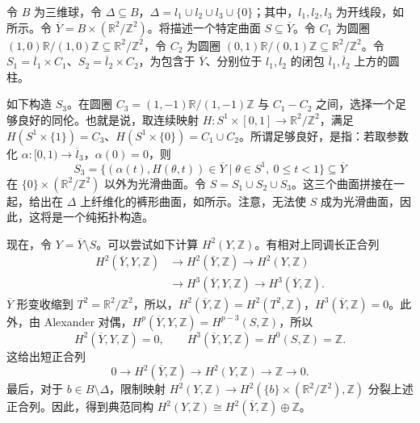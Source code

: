 \begin{construction}\label{constr:6.90}
令 $B$ 为三维球，令 $\Delta\subseteq B$，$\Delta=l_1\cup l_2\cup l_3\cup\{0\}$；其中，$l_1,l_2,l_3$ 为开线段，如所示。令 $\overline Y=B\times(\mathbb R^2/\mathbb Z^2)$。将描述一个特定曲面 $S\subseteq\overline Y$。令 $C_1$ 为圆圈 $(1,0)\mathbb R/(1,0)\mathbb Z\subseteq\mathbb R^2/\mathbb Z^2$，令 $C_2$ 为圆圈 $(0,1)\mathbb R/(0,1)\mathbb Z\subseteq\mathbb R^2/\mathbb Z^2$。令 $S_1=\overline l_1\times C_1$、$S_2=\overline l_2\times C_2$，为包含于 $\overline Y$、分别位于 $l_1,l_2$ 的闭包 $\overline l_1,\overline l_2$ 上方的圆柱。
\begin{figure}[H]
\centering
{}
\BookNumberOnlyCaption\label{fig:6.7}
\end{figure}

如下构造 $S_3$。在圆圈 $C_3=(1,-1)\mathbb R/(1,-1)\mathbb Z$ 与 $C_1-C_2$ 之间，选择一个足够良好的同伦。也就是说，取连续映射 $H\colon S^1\times[0,1]\to\mathbb R^2/\mathbb Z^2$，满足 $H(S^1\times\{1\})=C_3$、$H(S^1\times\{0\})=C_1\cup C_2$。所谓足够良好，是指：若取参数化 $\alpha\colon[0,1)\to\overline l_3$，$\alpha(0)=0$，则
\[
S_3=\{(\alpha(t),H(\theta,t))\in\overline Y
\mid\theta\in S^1,\ 0\leq t<1\}\subseteq\overline Y
\]
在 $\{0\}\times(\mathbb R^2/\mathbb Z^2)$ 以外为光滑曲面。令 $S=S_1\cup S_2\cup S_3$。这三个曲面拼接在一起，给出在 $\Delta$ 上纤维化的裤形曲面，如所示。注意，无法使 $S$ 成为光滑曲面，因此，这将是一个纯拓扑构造。

现在，令 $Y=\overline Y\setminus S$。可以尝试如下计算 $H^2(Y,\mathbb Z)$。有相对上同调长正合列
\[
\begin{aligned}
H^2(\overline Y,Y,\mathbb Z)&\longrightarrow H^2(\overline Y,\mathbb Z)
\longrightarrow H^2(Y,\mathbb Z)\\
&\longrightarrow H^3(\overline Y,Y,\mathbb Z)
\longrightarrow H^3(\overline Y,\mathbb Z).
\end{aligned}
\]
$\overline Y$ 形变收缩到 $T^2=\mathbb R^2/\mathbb Z^2$，所以，$H^2(\overline Y,\mathbb Z)=H^2(T^2,\mathbb Z)$，$H^3(\overline Y,\mathbb Z)=0$。此外，由 Alexander 对偶，$H^p(\overline Y,Y,\mathbb Z)=H^{p-3}(S,\mathbb Z)$，所以
\[
H^2(\overline Y,Y,\mathbb Z)=0,
\qquad
H^3(\overline Y,Y,\mathbb Z)=H^0(S,\mathbb Z)=\mathbb Z.
\]
这给出短正合列
\[
0\longrightarrow H^2(\overline Y,\mathbb Z)
\longrightarrow H^2(Y,\mathbb Z)\longrightarrow\mathbb Z\longrightarrow0.
\]
最后，对于 $b\in B\setminus\Delta$，限制映射 $H^2(Y,\mathbb Z)\to H^2(\{b\}\times(\mathbb R^2/\mathbb Z^2),\mathbb Z)$ 分裂上述正合列。因此，得到典范同构 $H^2(Y,\mathbb Z)\cong H^2(\overline Y,\mathbb Z)\oplus\mathbb Z$。
\begin{figure}[H]
\centering
{}
\BookNumberOnlyCaption\label{fig:6.8}
\end{figure}


\end{construction}
